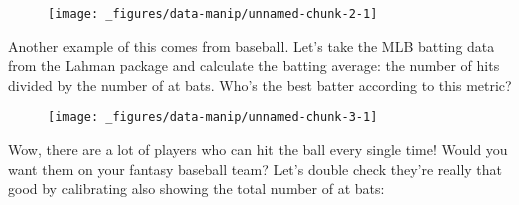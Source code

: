 \begin{figure}[H]
  \centering
  \texttt{[image: \_figures/data-manip/unnamed-chunk-2-1]}
\end{figure}

Another example of this comes from baseball. Let's take the MLB batting
data from the Lahman package and calculate the batting average: the
number of hits divided by the number of at bats. Who's the best batter
according to this metric?

\begin{Shaded}
\begin{Highlighting}[]
 \NormalTok{)}
\StringTok{ }\StringTok{ }\NormalTok{)}
\StringTok{ }
\StringTok{ }
    \NormalTok{) /}\StringTok{ } \NormalTok{)}
\NormalTok{)}
\StringTok{ }
\StringTok{  }\NormalTok{(} \NormalTok{)}
\end{Highlighting}
\end{Shaded}

\begin{figure}[H]
  \centering
  \texttt{[image: \_figures/data-manip/unnamed-chunk-3-1]}
\end{figure}

Wow, there are a lot of players who can hit the ball every single time!
Would you want them on your fantasy baseball team? Let's double check
they're really that good by calibrating also showing the total number of
at bats:

\begin{Shaded}
\begin{Highlighting}[]
\StringTok{ }
    \NormalTok{) /}\StringTok{ } \NormalTok{),}
    \NormalTok{)}
\NormalTok{)}
\StringTok{ }
\StringTok{  }\NormalTok{(} \NormalTok{) +}\StringTok{ }
\StringTok{  }\NormalTok{()}
\end{Highlighting}
\end{Shaded}

